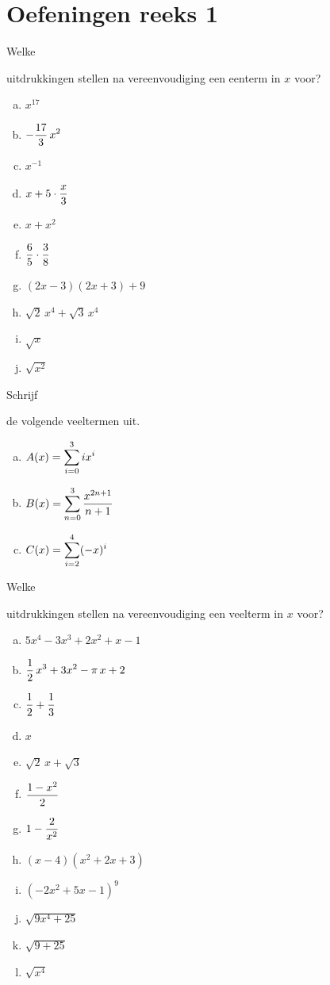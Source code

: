 \documentclass{ximera}
\begin{document}
\section*{Oefeningen reeks 1}

\begin{exercise} 
\hypertarget{oef1.1}{Welke} uitdrukkingen stellen na vereenvoudiging een eenterm in $x$ voor? 
\begin{multicols}{2}
\begin{enumerate}[(a)]
\item
$x^{17}$
\item
$\displaystyle -\frac{17}{3}\,x^2$
\item
$x^{-1}$
\item
$\displaystyle x + 5\cdot \frac{x}{3}$
\item
$x + x^2$
\item
$\displaystyle \frac{6}{5}\cdot\frac{3}{8}$
\item
$(2x-3)(2x+3)+9$
\item
$\sqrt{2}\,x^4 + \sqrt{3}\,x^4$
\item
$\sqrt{x}$
\item
$\sqrt{x^2}$
\end{enumerate}
\end{multicols}
\end{exercise} 

\begin{exercise} 
\hypertarget{oef1.2}{Schrijf} de volgende veeltermen uit.
\begin{enumerate}[(a)]
\item
$\displaystyle A(x) = \sum_{i=0}^3 ix^i$
\item
$\displaystyle B(x) = \sum_{n=0}^3 \frac{x^{2n+1}}{n+1}$
\item
$\displaystyle C(x) = \sum_{i=2}^4 (-x)^i$
\end{enumerate}
\end{exercise} 

\begin{exercise} 
\hypertarget{oef1.3}{Welke} uitdrukkingen stellen na vereenvoudiging een veelterm in $x$ voor? 
\begin{multicols}{2}
\begin{enumerate}[(a)]
\item
$5x^4-3x^3+2x^2+x-1$
\item
$\displaystyle \frac{1}{2}\,x^3 + 3x^2-\pi\,x+2$
\item
$\displaystyle \frac{1}{2}+\frac{1}{3}$
\item
$x$
\item
$\sqrt{2}\,x + \sqrt{3}$
\item
$\displaystyle \frac{1-x^2}{2}$ 
\item
$\displaystyle 1-\frac{2}{x^2}$
\item
$(x-4)(x^2+2x+3)$
\item
$(-2x^2+5x-1)^{9}$
\item
$\sqrt{9x^4+25}$
\item
$\sqrt{9+25}$
\item
$\sqrt{x^4}$
\end{enumerate}
\end{multicols}
\end{exercise} 
\end{document}
